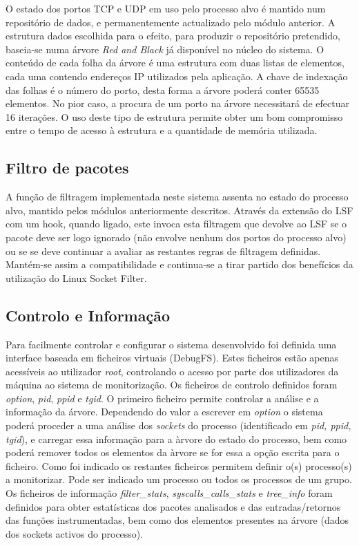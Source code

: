 O estado dos portos TCP e UDP em uso pelo processo alvo é mantido num repositório de dados, e permanentemente actualizado pelo módulo anterior. 
 A estrutura dados escolhida para o efeito, para produzir o repositório pretendido, baseia-se numa árvore \textit{Red and Black} já disponível no núcleo do sistema. O conteúdo de cada folha da árvore é uma estrutura com duas listas de elementos, cada uma contendo endereços IP utilizados pela aplicação. A chave de indexação das folhas é o número do porto, desta forma a árvore poderá conter 65535 elementos. No pior caso, a procura de um porto na árvore necessitará de efectuar 16 iterações.
  O uso deste tipo de estrutura permite obter um bom compromisso entre o tempo de acesso à estrutura e a quantidade de memória utilizada.


\subsection*{Filtro de pacotes}
\label{sub:packet_filter}

A função de filtragem  implementada neste sistema assenta no estado do processo alvo, mantido pelos módulos anteriormente descritos.
Através da extensão do LSF com um hook, quando ligado, este invoca esta filtragem que devolve ao LSF se o pacote deve ser logo ignorado (não envolve nenhum dos portos do processo alvo) ou se se deve continuar a avaliar as restantes regras de filtragem definidas. Mantém-se assim a compatibilidade e continua-se a tirar partido dos benefícios da utilização do Linux Socket Filter.



\subsection*{Controlo e Informação}
\label{sub:data_information}

Para facilmente controlar e configurar o sistema desenvolvido foi definida uma interface baseada em ficheiros virtuais (DebugFS). Estes ficheiros estão apenas acessíveis ao utilizador \textit{root}, controlando o acesso por parte dos utilizadores da máquina ao sistema de monitorização. Os ficheiros de controlo definidos foram \textit{option}, \textit{pid}, \textit{ppid} e \textit{tgid}. O primeiro ficheiro permite controlar a análise e a informação da árvore. Dependendo do valor a escrever em \textit{option} o sistema poderá proceder a uma análise dos \textit{sockets} do processo (identificado em \textit{pid, ppid, tgid}), e carregar essa informação para a àrvore do estado do processo, bem como poderá remover todos os elementos da àrvore se for essa a opção escrita para o ficheiro. Como foi indicado os restantes ficheiros permitem definir o(s) processo(s) a monitorizar. Pode ser indicado um processo ou todos os processos de um grupo. Os ficheiros de informação \textit{filter\_stats},  \textit{syscalls\_calls\_stats} e \textit{tree\_info} foram definidos para obter estatísticas dos pacotes analisados e das entradas/retornos das funções instrumentadas, bem como dos elementos presentes na árvore (dados dos sockets activos do processo).


